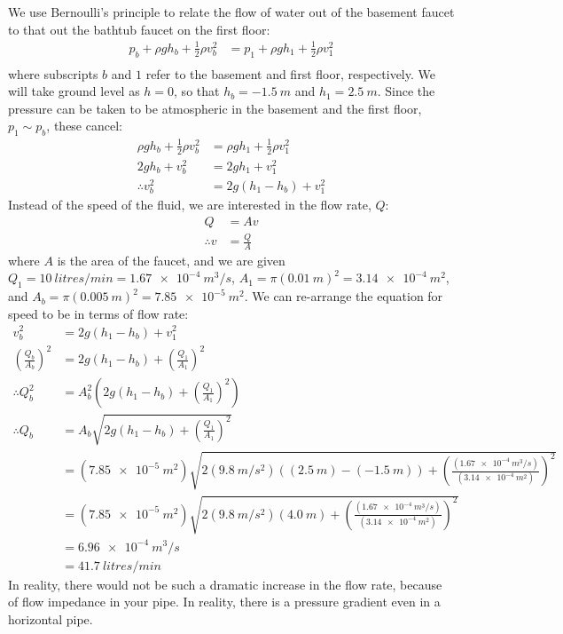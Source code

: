 \begin{solution}
	We use Bernoulli's principle to relate the flow of water out of the basement faucet to that out the bathtub faucet on the first floor:
	\begin{align*}
	p_b+\rho gh_b +\frac{1}{2}\rho v_b^2 &= p_1+\rho gh_1 +\frac{1}{2}\rho v_1^2 \\
	\end{align*}
	where subscripts $b$ and $1$ refer to the basement and first floor, respectively. We will take ground level as $h=0$, so that $h_b=\SI{-1.5}{m}$ and $h_1=\SI{2.5}{m}$. Since the pressure can be taken to be atmospheric in the basement and the first floor, $p_1\sim p_b$, these cancel:
	\begin{align*}
	\rho gh_b +\frac{1}{2}\rho v_b^2 &= \rho gh_1 +\frac{1}{2}\rho v_1^2 \\
	2gh_b +v_b^2 &= 2gh_1 + v_1^2 \\
	\therefore v_b^2 &= 2g(h_1-h_b) +v_1^2
	\end{align*}
	Instead of the speed of the fluid, we are interested in the flow rate, $Q$:
	\begin{align*}
	Q&=Av\\
	\therefore v&=\frac{Q}{A}
	\end{align*}
	where $A$ is the area of the faucet, and we are given $Q_1=\SI{10}{litres/min}=\SI{1.67e-4}{m^3/s}$, $A_1=\pi (\SI{0.01}{m})^2=\SI{3.14e-4}{m^2}$, and $A_b=\pi (\SI{0.005}{m})^2=\SI{7.85e-5}{m^2}$. We can re-arrange the equation for speed to be in terms of flow rate:
	\begin{align*}
	v_b^2 &= 2g(h_1-h_b) +v_1^2\\
	\left(\frac{Q_b}{A_b}\right)^2 &= 2g(h_1-h_b) +\left(\frac{Q_1}{A_1}\right)^2\\
	\therefore Q_b^2 &= A_b^2\left(2 g(h_1-h_b)+ \left(\frac{Q_1}{A_1}\right)^2\right)\\
	\therefore Q_b &= A_b\sqrt{2g(h_1-h_b)+ \left(\frac{Q_1}{A_1}\right)^2}\\
	&= (\SI{7.85e-5}{m^2})\sqrt{2(\SI{9.8}{m/s^2})((\SI{2.5}{m})-(\SI{-1.5}{m}))+ \left(\frac{(\SI{1.67e-4}{m^3/s})}{(\SI{3.14e-4}{m^2})}\right)^2}\\
	&=(\SI{7.85e-5}{m^2})\sqrt{2(\SI{9.8}{m/s^2})(\SI{4.0}{m})+ \left(\frac{(\SI{1.67e-4}{m^3/s})}{(\SI{3.14e-4}{m^2})}\right)^2}\\
	&=\SI{6.96e-4}{m^3/s}\\
	&=\SI{41.7}{litres/min}
	\end{align*}
	In reality, there would not be such a dramatic increase in the flow rate, because of flow impedance in your pipe. In reality, there is a pressure gradient even in a horizontal pipe.
\end{solution}

